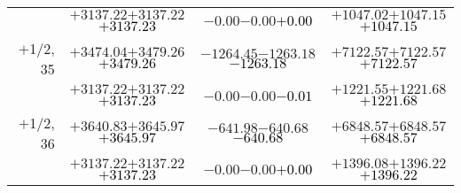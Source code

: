 \documentclass[compress]{beamer}
\begin{document}
\begin{frame}
{\begin{tabular}{r | c | c | c}
           & $+3137.22$\hspace{0.1 cm}$+3137.22$\hspace{0.1 cm}\textcolor{black}{$+3137.23$} & $-0.00$\hspace{0.1 cm}$-0.00$\hspace{0.1 cm}\textcolor{black}{$+0.00$} & $+1047.02$\hspace{0.1 cm}$+1047.15$\hspace{0.1 cm}\textcolor{black}{$+1047.15$} \\
$+$1/2, 35 & $+3474.04$\hspace{0.1 cm}$+3479.26$\hspace{0.1 cm}\textcolor{black}{$+3479.26$} & $-1264.45$\hspace{0.1 cm}$-1263.18$\hspace{0.1 cm}\textcolor{black}{$-1263.18$} & $+7122.57$\hspace{0.1 cm}$+7122.57$\hspace{0.1 cm}\textcolor{black}{$+7122.57$} \\
           & $+3137.22$\hspace{0.1 cm}$+3137.22$\hspace{0.1 cm}\textcolor{black}{$+3137.23$} & $-0.00$\hspace{0.1 cm}$-0.00$\hspace{0.1 cm}\textcolor{black}{$-0.01$} & $+1221.55$\hspace{0.1 cm}$+1221.68$\hspace{0.1 cm}\textcolor{black}{$+1221.68$} \\
$+$1/2, 36 & $+3640.83$\hspace{0.1 cm}$+3645.97$\hspace{0.1 cm}\textcolor{black}{$+3645.97$} & $-641.98$\hspace{0.1 cm}$-640.68$\hspace{0.1 cm}\textcolor{black}{$-640.68$} & $+6848.57$\hspace{0.1 cm}$+6848.57$\hspace{0.1 cm}\textcolor{black}{$+6848.57$} \\
           & $+3137.22$\hspace{0.1 cm}$+3137.22$\hspace{0.1 cm}\textcolor{black}{$+3137.23$} & $-0.00$\hspace{0.1 cm}$-0.00$\hspace{0.1 cm}\textcolor{black}{$+0.00$} & $+1396.08$\hspace{0.1 cm}$+1396.22$\hspace{0.1 cm}\textcolor{black}{$+1396.22$} \\
\end{tabular}}
\end{frame}
\end{document}
